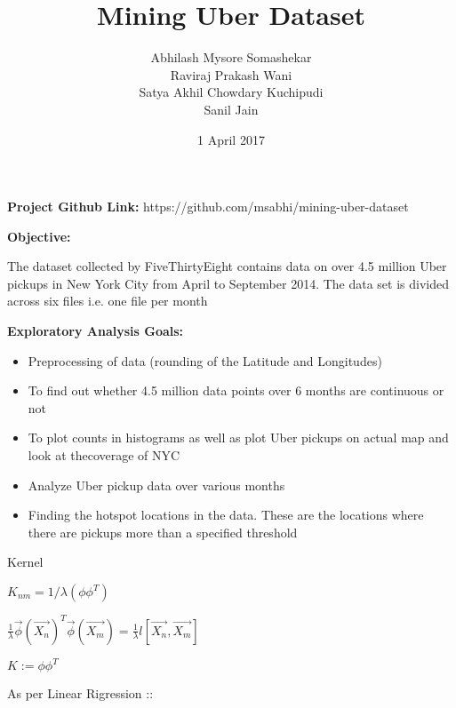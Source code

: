 \documentclass[12pt]{article}
\begin{document}
\begin{titlepage}
\title{Mining Uber Dataset}
\author{Abhilash Mysore Somashekar \\Raviraj Prakash Wani \\ Satya Akhil Chowdary Kuchipudi \\Sanil Jain}
\date{1 April 2017}
\maketitle
\end{titlepage}
\textbf{Project Github Link:} https://github.com/msabhi/mining-uber-dataset


\textbf{Objective:}

The dataset collected by FiveThirtyEight contains data on over 4.5 million Uber pickups in New York City from April to September 2014. The data set is divided across six files i.e. one file per month

\textbf{Exploratory Analysis Goals:}

\begin{itemize}
	\item Preprocessing of data (rounding of the Latitude and Longitudes)
	\item To find out whether 4.5 million data points over 6 months are continuous or not
	\item To plot counts in histograms as well as plot Uber pickups on actual map and look at thecoverage of NYC
	\item Analyze Uber pickup data over various months
	\item Finding the hotspot locations in the data. These are the locations where there are pickups more than a specified threshold
\end{itemize}

Kernel \\
\begin{center}
$K_{nm} = 1/\lambda \left ( \phi \phi ^{T} \right )$ \break

$\frac{1}{\lambda } \overrightarrow{\phi }\left ( \overrightarrow{X_{n}} \right )^{T}\overrightarrow{\phi }\left ( \overrightarrow{X_{m}} \right ) = \frac{1}{\lambda }l\left [ \overrightarrow{X_{n}},\overrightarrow{X_{m}} \right ]$ \break

$ K := \phi \phi ^{T}$ \break

\end{center}

As per Linear Rigression :: \\
\end{document}
